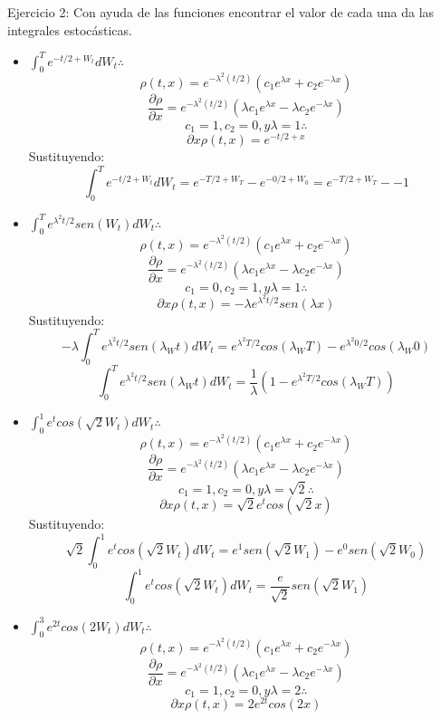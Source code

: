 \documentclass[11pt,fleqn]{book} %
\numberwithin{equation}{section} %
\numberwithin{figure}{section} %
\numberwithin{table}{section} %
\begin{document}
Ejercicio 2: Con ayuda de las funciones encontrar el valor de cada una da las integrales estocásticas. 
\begin{itemize}
    \item $\int_{0}^{T} e^{-t/2 + W_{t}} dW_{t} \therefore$
    $$\rho(t,x) = e^{-\lambda^{2} (t/2)} (c_{1} e^{\lambda x} + c_{2} e^{-\lambda x} ) $$
    $$ \frac{\partial \rho}{\partial x} = e^{-\lambda^{2} (t/2)} ( \lambda c_{1} e^{\lambda x} - \lambda c_{2} e^{-\lambda x} )    $$
    $$c_{1} = 1, c_{2} = 0, y \lambda = 1 \therefore$$
    $$ \partial x \rho(t,x) = e^{-t/2 + x} $$
    Sustituyendo:
    $$ \int_{0}^{T} e^{-t/2 + W_{t}} dW_{t} = e^{-T/2 + W_{T}} - e^{-0/2 + W_{0}} = e^{-T/2 + W_{T}} - -1 $$
    \item $\int_{0}^{T} e^{\lambda^{2} t/2} sen(W_{t}) dW_{t} \therefore$
    $$\rho(t,x) = e^{-\lambda^{2} (t/2)} (c_{1} e^{\lambda x} + c_{2} e^{-\lambda x} ) $$
    $$ \frac{\partial \rho}{\partial x} = e^{-\lambda^{2} (t/2)} ( \lambda c_{1} e^{\lambda x} - \lambda c_{2} e^{-\lambda x} )    $$
    $$c_{1} = 0, c_{2} = 1, y \lambda = 1 \therefore$$
    $$ \partial x \rho(t,x) = -\lambda e^{\lambda^{2} t/2} sen(\lambda x)$$
    Sustituyendo:
    $$ -\lambda \int_{0}^{T} e^{\lambda^{2} t/2} sen(\lambda _W{t}) dW_{t} = e^{\lambda^{2} T/2} cos(\lambda _W{T}) - e^{\lambda^{2} 0/2} cos(\lambda _W{0}) $$
    $$ \int_{0}^{T} e^{\lambda^{2} t/2} sen(\lambda _W{t}) dW_{t} = \frac{1}{\lambda} (1 - e^{\lambda^{2} T/2} cos(\lambda _W{T}) ) $$
    \item $\int_{0}^{1} e^{t} cos(\sqrt{2} W_{t}) dW_{t} \therefore$
    $$\rho(t,x) = e^{-\lambda^{2} (t/2)} (c_{1} e^{\lambda x} + c_{2} e^{-\lambda x} ) $$
    $$ \frac{\partial \rho}{\partial x} = e^{-\lambda^{2} (t/2)} ( \lambda c_{1} e^{\lambda x} - \lambda c_{2} e^{-\lambda x} )    $$
    $$c_{1} = 1, c_{2} = 0, y \lambda = \sqrt{2} \therefore$$
    $$ \partial x \rho(t,x) = \sqrt{2} e^{t} cos(\sqrt{2} x)$$
    Sustituyendo:
    $$ \sqrt{2} \int_{0}^{1} e^{t} cos(\sqrt{2} W_{t}) dW_{t} = e^{1} sen(\sqrt{2} W_{1}) - e^{0} sen(\sqrt{2} W_{0})$$
    $$ \int_{0}^{1} e^{t} cos(\sqrt{2} W_{t}) dW_{t} = \frac{e}{\sqrt{2}} sen(\sqrt{2} W_{1}) $$
    \item $\int_{0}^{3} e^{2t} cos(2 W_{t}) dW_{t} \therefore$
    $$\rho(t,x) = e^{-\lambda^{2} (t/2)} (c_{1} e^{\lambda x} + c_{2} e^{-\lambda x} ) $$
    $$ \frac{\partial \rho}{\partial x} = e^{-\lambda^{2} (t/2)} ( \lambda c_{1} e^{\lambda x} - \lambda c_{2} e^{-\lambda x} )    $$
    $$c_{1} = 1, c_{2} = 0, y \lambda = 2 \therefore$$
    $$ \partial x \rho(t,x) = 2 e^{2t} cos(2x)$$

\end{itemize}
\end{document}
